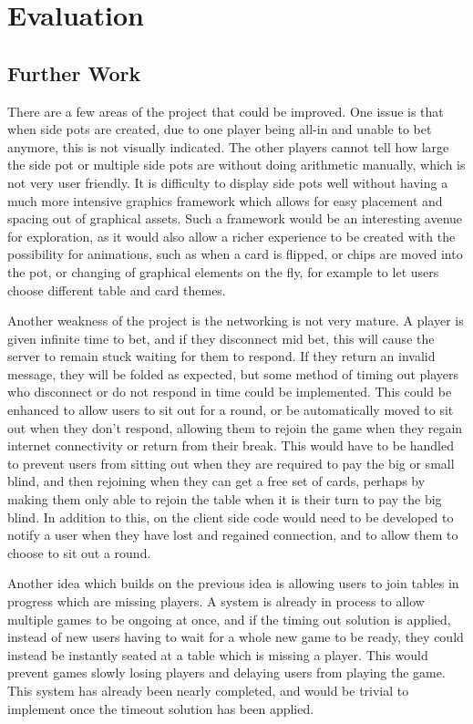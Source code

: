 \section{Evaluation}

\subsection{Further Work}
There are a few areas of the project that could be improved. One issue is that
when side pots are created, due to one player being all-in and unable to bet
anymore, this is not visually indicated. The other players cannot tell how
large the side pot or multiple side pots are without doing arithmetic manually,
which is not very user friendly. It is difficulty to display side pots well
without having a much more intensive graphics framework which allows for easy
placement and spacing out of graphical assets. Such a framework would be an
interesting avenue for exploration, as it would also allow a richer experience
to be created with the possibility for animations, such as when a card is
flipped, or chips are moved into the pot, or changing of graphical elements
on the fly, for example to let users choose different table and card themes.

Another weakness of the project is the networking is not very mature. A player
is given infinite time to bet, and if they disconnect mid bet, this will
cause the server to remain stuck waiting for them to respond. If they return
an invalid message, they will be folded as expected, but some method of timing
out players who disconnect or do not respond in time could be implemented.
This could be enhanced to allow users to sit out for a round, or be
automatically moved to sit out when they don't respond, allowing them to
rejoin the game when they regain internet connectivity or return from their
break. This would have to be handled to prevent users from sitting out when
they are required to pay the big or small blind, and then rejoining when they
can get a free set of cards, perhaps by making them only able to rejoin
the table when it is their turn to pay the big blind. In addition to this,
on the client side code would need to be developed to notify a user when they
have lost and regained connection, and to allow them to choose to sit out a 
round.

Another idea which builds on the previous idea is allowing users to join
tables in progress which are missing players. A system is already in process
to allow multiple games to be ongoing at once, and if the timing out solution
is applied, instead of new users having to wait for a whole new game to be
ready, they could instead be instantly seated at a table which is missing
a player. This would prevent games slowly losing players and delaying users
from playing the game. This system has already been nearly completed, and
would be trivial to implement once the timeout solution has been applied.

